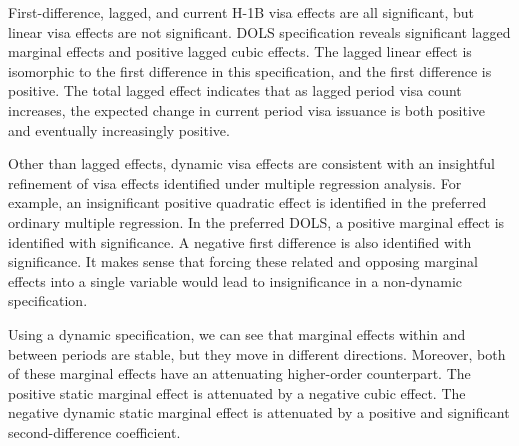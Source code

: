 \documentclass[review]{elsarticle}
\begin{document}

First-difference, lagged, and current H-1B visa effects are all significant, but linear visa effects are not significant.
DOLS specification reveals significant lagged marginal effects and positive lagged cubic effects.
The lagged linear effect is isomorphic to the first difference in this specification, and the first difference is positive.
The total lagged effect indicates that as lagged period visa count increases,
the expected change in current period visa issuance is both positive and eventually increasingly positive.

Other than lagged effects, dynamic visa effects are consistent with an insightful refinement of
visa effects identified under multiple regression analysis.
For example, an insignificant positive quadratic effect is identified in the preferred ordinary multiple regression.
In the preferred DOLS, a positive marginal effect is identified with significance.
A negative first difference is also identified with significance.
It makes sense that forcing these related and opposing marginal effects into a single variable would lead
to insignificance in a non-dynamic specification.

Using a dynamic specification, we can see that marginal effects within and between periods are stable,
but they move in different directions.
Moreover, both of these marginal effects have an attenuating higher-order counterpart.
The positive static marginal effect is attenuated by a negative cubic effect.
The negative dynamic static marginal effect is attenuated by a positive and significant second-difference coefficient.
\end{document}
